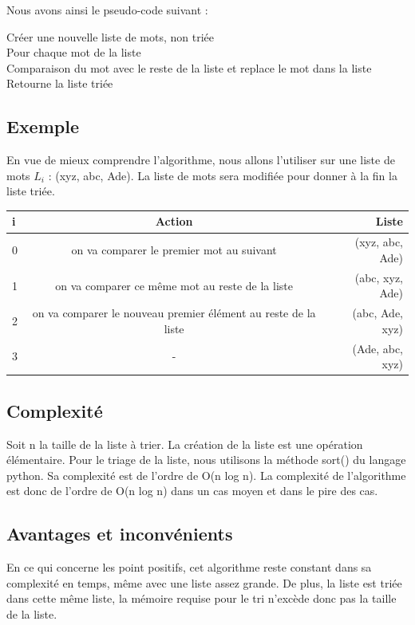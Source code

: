 \documentclass[12pt]{article}
\begin{document}
Nous avons ainsi le pseudo-code suivant :

\begin{tcolorbox}
Créer une nouvelle liste de mots, non triée \\
 

Pour chaque mot de la liste\\
\hspace*{1.0 cm} Comparaison du mot avec le reste de la liste et replace le mot dans la liste\\

Retourne la liste triée\\
\end{tcolorbox}

\subsection{Exemple}
\hspace{1.0 cm} En vue de mieux comprendre l'algorithme, nous allons l'utiliser sur une liste de mots $ L_{i} $ : (xyz, abc, Ade). La liste de mots sera modifiée pour donner à la fin la liste triée.

\vspace{0.5 cm}

\begin{tabular}{|l|c|r|}
  \hline
  i & Action & Liste \\
  \hline
  0 &		on va comparer le premier mot au suivant & (xyz, abc, Ade)\\
  1 &		on va comparer ce même mot au reste de la liste &	(abc, xyz, Ade)\\
  2 &		on va comparer le nouveau premier élément au reste de la liste &	(abc, Ade, xyz)\\
  3 &		 - &	(Ade, abc, xyz)\\
  \hline
\end{tabular}

\subsection{Complexité}
\hspace{1.0 cm} Soit n la taille de la liste à trier. La  création de la liste est une opération élémentaire. Pour le triage de la liste, nous utilisons la méthode sort() du langage python. Sa complexité est de l'ordre de O(n log n). La complexité de l'algorithme est donc de l'ordre de O(n log n) dans un cas moyen et dans le pire des cas.

\subsection{Avantages et inconvénients}
\hspace{1.0 cm} En ce qui concerne les point positifs, cet algorithme reste constant dans sa complexité en temps, même avec une liste assez grande. De plus, la liste est triée dans cette même liste, la mémoire requise pour le tri n'excède donc pas la taille de la liste.
\end{document}

